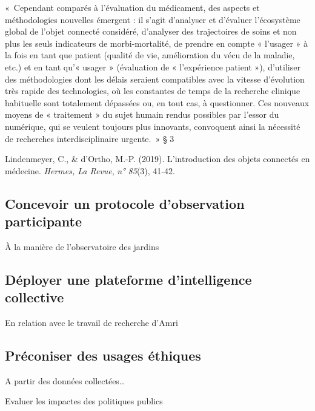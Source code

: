 \documentclass[
  letterpaper,
  DIV=11,
  numbers=noendperiod]{scrreprt}
\begin{document}
«~Cependant comparés à l'évaluation du médicament, des aspects et
méthodologies nouvelles émergent : il s'agit d'analyser et d'évaluer
l'écosystème global de l'objet connecté considéré, d'analyser des
trajectoires de soins et non plus les seuls indicateurs de
morbi-mortalité, de prendre en compte « l'usager » à la fois en tant que
patient (qualité de vie, amélioration du vécu de la maladie, etc.) et en
tant qu'« usager » (évaluation de « l'expérience patient »), d'utiliser
des méthodologies dont les délais seraient compatibles avec la vitesse
d'évolution très rapide des technologies, où les constantes de temps de
la recherche clinique habituelle sont totalement dépassées ou, en tout
cas, à questionner. Ces nouveaux moyens de « traitement » du sujet
humain rendus possibles par l'essor du numérique, qui se veulent
toujours plus innovants, convoquent ainsi la nécessité de recherches
interdisciplinaire urgente.~» § 3

Lindenmeyer, C., \& d'Ortho, M.-P. (2019). L'introduction des objets
connectés en médecine. \emph{Hermes, La Revue}, \emph{n° 85}(3), 41‑42.

\hypertarget{concevoir-un-protocole-dobservation-participante}{%
\subsection{Concevoir un protocole d'observation
participante}\label{concevoir-un-protocole-dobservation-participante}}

À la manière de l'observatoire des jardins

\hypertarget{duxe9ployer-une-plateforme-dintelligence-collective}{%
\subsection{Déployer une plateforme d'intelligence
collective}\label{duxe9ployer-une-plateforme-dintelligence-collective}}

En relation avec le travail de recherche d'Amri

\hypertarget{pruxe9coniser-des-usages-uxe9thiques}{%
\subsection{Préconiser des usages
éthiques}\label{pruxe9coniser-des-usages-uxe9thiques}}

A partir des données collectées\ldots{}

Evaluer les impactes des politiques publics
\end{document}
